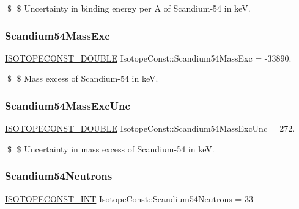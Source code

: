 \$ \$ Uncertainty in binding energy per A of Scandium-\/54 in keV. \mbox{\label{group___isotope_const-_scandium-_sc54_gaa2f63d2fc268ea21b32d84dbb4e9f7df}} 
\subsubsection{\texorpdfstring{Scandium54\+Mass\+Exc}{Scandium54MassExc}}
{\footnotesize\ttfamily \mbox{\hyperlink{group___isotope_const-_macros_ga8f45a7272ce02c0b4c65c44636ed719a}{I\+S\+O\+T\+O\+P\+E\+C\+O\+N\+S\+T\+\_\+\+D\+O\+U\+B\+LE}} Isotope\+Const\+::\+Scandium54\+Mass\+Exc = -\/33890.}

\$ \$ Mass excess of Scandium-\/54 in keV. \mbox{\label{group___isotope_const-_scandium-_sc54_ga55b9941df2761735b8cad9c92de3c766}} 
\subsubsection{\texorpdfstring{Scandium54\+Mass\+Exc\+Unc}{Scandium54MassExcUnc}}
{\footnotesize\ttfamily \mbox{\hyperlink{group___isotope_const-_macros_ga8f45a7272ce02c0b4c65c44636ed719a}{I\+S\+O\+T\+O\+P\+E\+C\+O\+N\+S\+T\+\_\+\+D\+O\+U\+B\+LE}} Isotope\+Const\+::\+Scandium54\+Mass\+Exc\+Unc = 272.}

\$ \$ Uncertainty in mass excess of Scandium-\/54 in keV. \mbox{\label{group___isotope_const-_scandium-_sc54_ga47bfa132772d391e1020d638838a6ff1}} 
\subsubsection{\texorpdfstring{Scandium54\+Neutrons}{Scandium54Neutrons}}
{\footnotesize\ttfamily \mbox{\hyperlink{group___isotope_const-_macros_ga5f18360b3e99483a35c32d789e62621c}{I\+S\+O\+T\+O\+P\+E\+C\+O\+N\+S\+T\+\_\+\+I\+NT}} Isotope\+Const\+::\+Scandium54\+Neutrons = 33}

